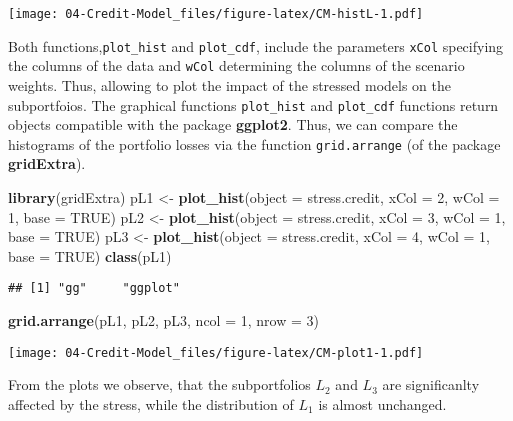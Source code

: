 \documentclass[]{article}
\newenvironment{Shaded}{\begin{snugshade}}{\end{snugshade}}
\newcommand{\DataTypeTok}[1]{\textcolor[rgb]{0.13,0.29,0.53}{#1}}
\newcommand{\DecValTok}[1]{\textcolor[rgb]{0.00,0.00,0.81}{#1}}
\newcommand{\KeywordTok}[1]{\textcolor[rgb]{0.13,0.29,0.53}{\textbf{#1}}}
\newcommand{\NormalTok}[1]{#1}
\newcommand{\OtherTok}[1]{\textcolor[rgb]{0.56,0.35,0.01}{#1}}
\newcommand{\StringTok}[1]{\textcolor[rgb]{0.31,0.60,0.02}{#1}}
\begin{document}
\texttt{[image: 04-Credit-Model\_files/figure-latex/CM-histL-1.pdf]}

Both functions,\texttt{plot\_hist} and \texttt{plot\_cdf}, include the parameters \texttt{xCol} specifying the columns of the data and \texttt{wCol} determining the columns of the scenario weights. Thus, allowing to plot the impact of the stressed models on the subportfoios. The graphical functions \texttt{plot\_hist} and \texttt{plot\_cdf} functions return objects compatible with the package \textbf{ggplot2}. Thus, we can compare the histograms of the portfolio losses via the function \texttt{grid.arrange} (of the package \textbf{gridExtra}).

\begin{Shaded}
\begin{Highlighting}[]
\KeywordTok{library}\NormalTok{(gridExtra)}
\NormalTok{pL1 <-}\StringTok{ }\KeywordTok{plot_hist}\NormalTok{(}\DataTypeTok{object =}\NormalTok{ stress.credit, }\DataTypeTok{xCol =} \DecValTok{2}\NormalTok{, }\DataTypeTok{wCol =} \DecValTok{1}\NormalTok{, }\DataTypeTok{base =} \OtherTok{TRUE}\NormalTok{)}
\NormalTok{pL2 <-}\StringTok{ }\KeywordTok{plot_hist}\NormalTok{(}\DataTypeTok{object =}\NormalTok{ stress.credit, }\DataTypeTok{xCol =} \DecValTok{3}\NormalTok{, }\DataTypeTok{wCol =} \DecValTok{1}\NormalTok{, }\DataTypeTok{base =} \OtherTok{TRUE}\NormalTok{)}
\NormalTok{pL3 <-}\StringTok{ }\KeywordTok{plot_hist}\NormalTok{(}\DataTypeTok{object =}\NormalTok{ stress.credit, }\DataTypeTok{xCol =} \DecValTok{4}\NormalTok{, }\DataTypeTok{wCol =} \DecValTok{1}\NormalTok{, }\DataTypeTok{base =} \OtherTok{TRUE}\NormalTok{)}
\KeywordTok{class}\NormalTok{(pL1)}
\end{Highlighting}
\end{Shaded}

\begin{verbatim}
## [1] "gg"     "ggplot"
\end{verbatim}

\begin{Shaded}
\begin{Highlighting}[]
\KeywordTok{grid.arrange}\NormalTok{(pL1, pL2, pL3, }\DataTypeTok{ncol =} \DecValTok{1}\NormalTok{, }\DataTypeTok{nrow =} \DecValTok{3}\NormalTok{)}
\end{Highlighting}
\end{Shaded}

\texttt{[image: 04-Credit-Model\_files/figure-latex/CM-plot1-1.pdf]}

From the plots we observe, that the subportfolios \(L_2\) and \(L_3\) are significanlty affected by the stress, while the distribution of \(L_1\) is almost unchanged.
\end{document}

